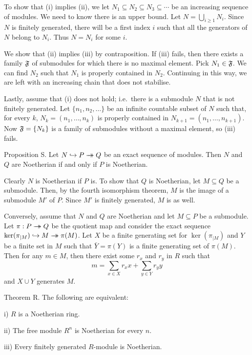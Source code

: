 \proof To show that (i) implies (ii), we let $N_1\subseteq N_2 \subseteq N_3 \subseteq \cdots$ be an increasing sequence of modules. We need to know there is an upper bound. Let $N = \bigcup_{i\geq 1} N_i$. Since $N$ is finitely generated, there will be a first index $i$ such that all the generators of $N$ belong to $N_i$. Thus $N = N_i$ for some $i$.

We show that (ii) implies (iii) by contraposition. If (iii) fails, then there exists a family $\frak F$ of submodules for which there is no maximal element. Pick $N_1\in \frak F$. We can find $N_2$ such that $N_1$ is properly contained in $N_2$. Continuing in this way, we are left with an increasing chain that does not stabilise.

Lastly, assume that (i) does not hold; i.e.\ there is a submodule $N$ that is not finitely generated. Let $\{n_1,n_2,\ldots\}$ be an infinite countable subset of $N$ such that, for every $k$, $N_k = (n_1,\ldots,n_k)$ is properly contained in $N_{k+1} = (n_1,\ldots,n_{k+1})$. Now $\frak F = \{N_k\}$ is a family of submodules without a maximal element, so (iii) fails.\slug

\proclaim Proposition S. Let $N \hookrightarrow P\rightarrow\!\!\!\!\!\rightarrow Q$ be an exact sequence of modules. Then $N$ and $Q$ are Noetherian if and only if $P$ is Noetherian.

\proof Clearly $N$ is Noetherian if $P$ is. To show that $Q$ is Noetherian, let $M\subseteq Q$ be a submodule. Then, by the fourth isomorphism theorem, $M$ is the image of a submodule $M'$ of $P$. Since $M'$ is finitely generated, $M$ is as well.

Conversely, assume that $N$ and $Q$ are Noetherian and let $M\subseteq P$ be a submodule. Let $\pi:P\rightarrow\!\!\!\!\!\rightarrow Q$ be the quotient map and consider the exact sequence $\ker(\pi_{|M})\hookrightarrow M\rightarrow\!\!\!\!\!\rightarrow \pi(M)$. Let $X$ be a finite generating set for $\ker(\pi_{|M})$ and $Y$ be a finite set in $M$ such that $\bar Y = \pi(Y)$ is a finite generating set of $\pi(M)$. Then for any $m\in M$, then there exist some $r_x$ and $r_y$ in $R$ such that
$$m = \sum_{x\in X} r_x x + \sum_{y\in Y} r_y y$$
and $X\cup Y$ generates $M$.\slug

\proclaim Theorem R. The following are equivalent:
\medskip
\item{i)} $R$ is a Noetherian ring.
\smallskip
\item{ii)} The free module $R^n$ is Noetherian for every $n$.
\smallskip
\item{iii)} Every finitely generated $R$-module is Noetherian.\noskipslug
\medskip

